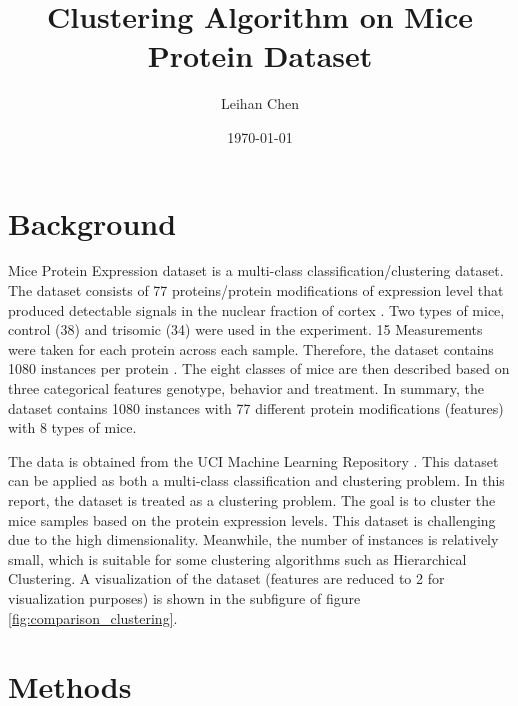 \documentclass[12pt,a4paper]{article}
\title{Clustering Algorithm on Mice Protein Dataset}
\author{Leihan Chen}
\date{\today}
\begin{document}

\section{Background}
Mice Protein Expression dataset is a multi-class classification/clustering dataset. 
The dataset consists of 77 proteins/protein modifications of expression level that produced detectable signals in the nuclear fraction of cortex \cite{mpe_342}. 
Two types of mice, control (38) and trisomic (34) were used in the experiment. 15 Measurements were taken for each protein across each sample. Therefore, the dataset contains 1080 instances per protein \cite{Higuera2015SelfOrganizingFM}.
The eight classes of mice are then described based on three categorical features genotype, behavior and treatment. In summary, the dataset contains 1080 instances with 77 different protein modifications (features) with 8 types of mice.

The data is obtained from the UCI Machine Learning Repository \cite{mpe_342}. This dataset can be applied as both a multi-class classification and clustering problem. In this report, the dataset is treated as a clustering problem. 
The goal is to cluster the mice samples based on the protein expression levels. This dataset is challenging due to the high dimensionality. 
Meanwhile, the number of instances is relatively small, which is suitable for some clustering algorithms such as Hierarchical Clustering. A visualization of the dataset (features are reduced to 2 for visualization purposes) is shown in the subfigure of figure \ref{fig:comparison_clustering}.


\section{Methods}\label{sec:methods}
\end{document}
